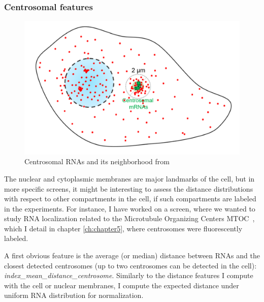 \subsubsection{Centrosomal features}

\begin{figure}
	\begin{center}
	\includegraphics[width=\linewidth]{figures/chapter4/centrosomal_features}
	\caption[Centrosomal neighborhood]{Centrosomal RNAs and its neighborhood from~\cite{safieddine_choreography_2021}}
	\label{fig:centrosome_features}
	\end{center}
\end{figure}

The nuclear and cytoplasmic membranes are major landmarks of the cell, but in more specific screens, it might be interesting to assess the distance distributions with respect to other compartments in the cell, if such compartments are labeled in the experiments.
For instance, I have worked on a screen, where we wanted to study \ac{RNA} localization related to the Microtubule Organizing Centers \ac{MTOC}~\cite{safieddine_choreography_2021}, which I detail in chapter \ref{ch:chapter5}, where centrosomes were fluorescently labeled.

A first obvious feature is the average (or median) distance between \ac{RNA}s and the closest detected centrosomes (up to two centrosomes can be detected in the cell): \emph{index\_mean\_distance\_centrosome}.
Similarly to the distance features I compute with the cell or nuclear membranes, I compute the expected distance under uniform \ac{RNA} distribution for normalization.

